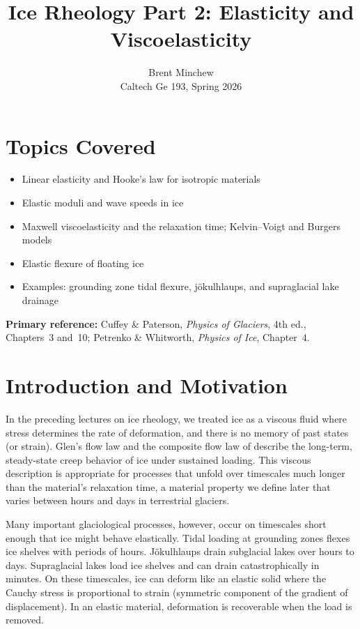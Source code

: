 \documentclass[11pt]{article}
\title{Ice Rheology Part 2: Elasticity and Viscoelasticity}
\author{Brent Minchew \\Caltech Ge 193, Spring 2026}
\date{}
\begin{document}
\maketitle

\section*{Topics Covered}

\begin{itemize}
  \item Linear elasticity and Hooke's law for isotropic materials
  \item Elastic moduli and wave speeds in ice
  \item Maxwell viscoelasticity and the relaxation time; Kelvin--Voigt and Burgers models
  \item Elastic flexure of floating ice
  \item Examples: grounding zone tidal flexure, j\"{o}kulhlaups, and supraglacial lake drainage
\end{itemize}

\noindent\textbf{Primary reference:} Cuffey \& Paterson, \textit{Physics of Glaciers}, 4th ed., Chapters~3 and~10; Petrenko \& Whitworth, \textit{Physics of Ice}, Chapter~4.

\section{Introduction and Motivation}
\label{sec:introduction}

In the preceding lectures on ice rheology, we treated ice as a viscous fluid where stress determines the rate of deformation, and there is no memory of past states (or strain).  Glen's flow law and the composite flow law of \cite{GoldsbyKohlstedt2001} describe the long-term, steady-state creep behavior of ice under sustained loading.  This viscous description is appropriate for processes that unfold over timescales much longer than the material's relaxation time, a material property we define later that varies between hours and days in terrestrial glaciers.

\medskip
\noindent Many important glaciological processes, however, occur on timescales short enough that ice might behave elastically.  Tidal loading at grounding zones flexes ice shelves with periods of hours.  J\"{o}kulhlaups drain subglacial lakes over hours to days.  Supraglacial lakes load ice shelves and can drain catastrophically in minutes.  On these timescales, ice can deform like an elastic solid where the Cauchy stress is proportional to strain (symmetric component of the gradient of displacement). In an elastic material, deformation is recoverable when the load is removed.
\end{document}
